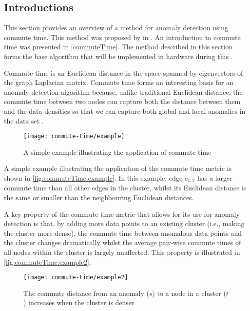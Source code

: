 \subsection{Introductions}
\label{anomalyDetection:commuteTime:introduction}
This section provides an overview of a method for anomaly detection using
commute time. This method was proposed by \citeauthor{Khoa:2012} in
 \cite{Khoa:2012}. An introduction to commute time was
presented in \autoref{commuteTime}. The method described in this section forms
the base algorithm that will be implemented in hardware during this \thesis{}.

Commute time is an Euclidean distance in the space spanned by eigenvectors of
the graph Laplacian matrix. Commute time forms an interesting basis for an
anomaly detection algorithm because, unlike traditional Euclidean distance,
the commute time between two nodes can capture both the distance between them
and the data densities so that we can capture both global and local anomalies in
the data set \cite{Khoa:2012}.

\begin{figure}
    \centering
    \texttt{[image: commute-time/example]}
    \caption{A simple example illustrating the application of commute time
        \cite{Khoa:2012}}
    \label{fig:commuteTime:example}
\end{figure}

A simple example illustrating the application of the commute time metric is
shown in \autoref{fig:commuteTime:example}. In this example, edge $e_{1,2}$ has
a larger commute time than all other edges in the cluster, whilst its Euclidean
distance is the same or smaller than the neighbouring Euclidean distances.

A key property of the commute time metric that allows for its use for anomaly
detection is that, by adding more data points to an existing cluster (i.e.,
making the cluster more dense), the commute time between anomalous data points
and the cluster changes dramatically whilst the average pair-wise commute times
of all nodes within the cluster is largely unaffected. This property is
illustrated in \autoref{fig:commuteTime:example2}.

\begin{figure}
    \centering
    \texttt{[image: commute-time/example2]}
    \caption[The commute distance from an anomaly to a node in a cluster
        increases when the cluster is denser]{The commute distance from an
        anomaly ($s$) to a node in a cluster ($t$) increases when the cluster is
        denser \cite{Khoa:2012}}
\end{figure}

